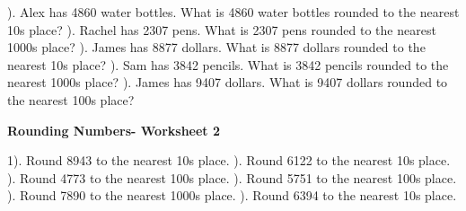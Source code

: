 \documentclass{article}%
\begin{document}
\newline%
). Alex has 4860 water bottles. What is 4860 water bottles rounded to the nearest 10s place?%
\newline%
\newline%
). Rachel has 2307 pens. What is 2307 pens rounded to the nearest 1000s place?%
\newline%
\newline%
). James has 8877 dollars. What is 8877 dollars rounded to the nearest 10s place?%
\newline%
\newline%
). Sam has 3842 pencils. What is 3842 pencils rounded to the nearest 1000s place?%
\newline%
\newline%
). James has 9407 dollars. What is 9407 dollars rounded to the nearest 100s place?%
\newline%
\newline%
\newline%
\pagebreak%
\large%
\begin{center}%
\textbf{Rounding Numbers- Worksheet 2}%
\newline%
\end{center} \normalsize%
1). Round 8943 to the nearest 10s place.%
\newline%
\newline%
). Round 6122 to the nearest 10s place.%
\newline%
\newline%
). Round 4773 to the nearest 100s place.%
\newline%
\newline%
). Round 5751 to the nearest 100s place.%
\newline%
\newline%
). Round 7890 to the nearest 1000s place.%
\newline%
\newline%
). Round 6394 to the nearest 10s place.%
\newline%
\newline%
\end{document}
